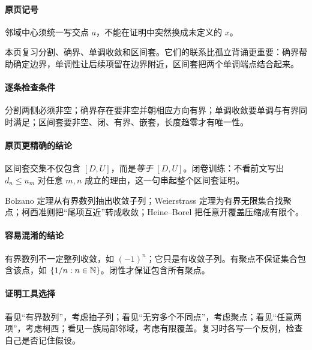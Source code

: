 \paragraph{原页记号}邻域中心须统一写交点 $a$，不能在证明中突然换成未定义的 $x$。

本页复习分割、确界、单调收敛和区间套。它们的联系比孤立背诵更重要：确界帮助确定边界，单调性让后续项留在边界附近，区间套把两个单调端点结合起来。
\paragraph{逐条检查条件}分割两侧必须非空；确界存在要非空并朝相应方向有界；单调收敛要单调与有界同时满足；区间套要非空、闭、有界、嵌套，长度趋零才有唯一性。
\paragraph{原页更精确的结论}区间套交集不仅包含 $[D,U]$，而是\emph{等于} $[D,U]$。闭卷训练：不看前文写出 $d_n\le u_m$ 对任意 $m,n$ 成立的理由，这一句串起整个区间套证明。

Bolzano 定理从有界数列抽出收敛子列；Weierstrass 定理为有界无限集合找聚点；柯西准则把“尾项互近”转成收敛；Heine--Borel 把任意开覆盖压缩成有限个。
\paragraph{容易混淆的结论}有界数列不一定整列收敛，如 $(-1)^n$；它只是有收敛子列。有聚点不保证集合包含该点，如 $\{1/n:n\in\mathbb{N}\}$。闭性才保证包含所有聚点。
\paragraph{证明工具选择}看见“有界数列”，考虑抽子列；看见“无穷多个不同点”，考虑聚点；看见“任意两项”，考虑柯西；看见一族局部邻域，考虑有限覆盖。复习时各写一个反例，检查自己是否记住假设。